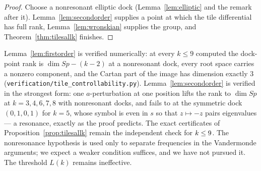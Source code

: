 \begin{proof}
Choose a nonresonant elliptic dock (Lemma~\ref{lem:elliptic} and the remark
after it). Lemma~\ref{lem:secondorder} supplies a point at which the tile
differential has full rank, Lemma~\ref{lem:wronskian} supplies the group, and
Theorem~\ref{thm:tilesallk} finishes.
\end{proof}

\begin{remark}
Lemma~\ref{lem:firstorder} is verified numerically: at every $k\le9$ computed
the dock-point rank is $\dim Sp-(k-2)$ at a nonresonant dock, every root space
carries a nonzero component, and the Cartan part of the image has dimension
exactly $3$ (\texttt{verification/tile\_controllability.py}). Lemma~\ref{lem:secondorder}
is verified in the strongest form: one $a$-perturbation at one position lifts
the rank to $\dim Sp$ at $k=3,4,6,7,8$ with nonresonant docks, and fails to
at the symmetric dock $(0,1,0,1)$ for $k=5$, whose symbol is even in $s$ so
that $z\mapsto-z$ pairs eigenvalues --- a resonance, exactly as the proof
predicts. The exact certificates of Proposition~\ref{prop:tilesallk} remain
the independent check for $k\le9$. The nonresonance hypothesis is
used only to separate frequencies in the Vandermonde arguments; we expect a
weaker condition suffices, and we have not pursued it. The threshold $L(k)$
remains ineffective.
\end{remark}
